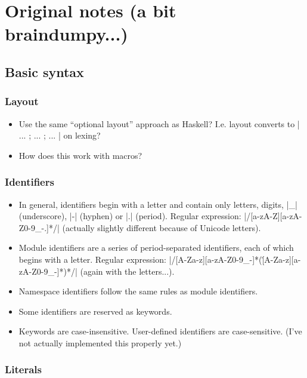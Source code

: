 \documentclass[DIV=calc,paper=a4,fontsize=11pt]{scrartcl}
\begin{document}
\section*{Original notes (a bit braindumpy...)}

\subsection*{Basic syntax}

\subsubsection*{Layout}

\begin{itemize}
  \item{Use the same ``optional layout'' approach as Haskell?
    I.e. layout converts to |{ ... ; ... ; ... }| on lexing?}
  \item{How does this work with macros?}
\end{itemize}

\subsubsection*{Identifiers}

\begin{itemize}
  \item{In general, identifiers begin with a letter and contain only
    letters, digits, |_| (underscore), |-| (hyphen) or |.| (period).
    Regular expression: |/[a-zA-Z][a-zA-Z0-9_-.]*/| (actually slightly
    different because of Unicode letters).}
  \item{Module identifiers are a series of period-separated
    identifiers, each of which begins with a letter.  Regular
    expression: |/[A-Za-z][a-zA-Z0-9_-]*(\.[A-Za-z][a-zA-Z0-9_-]*)*/|
    (again with the letters...).}
  \item{Namespace identifiers follow the same rules as module
    identifiers.}
  \item{Some identifiers are reserved as keywords.}
  \item{Keywords are case-insensitive.  User-defined identifiers are
    case-sensitive.  (I've not actually implemented this properly
    yet.)}
\end{itemize}

\subsubsection*{Literals}
\end{document}
